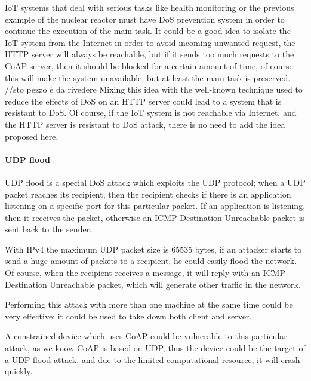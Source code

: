 	IoT systems that deal with serious tasks like health monitoring or the previous example of the nuclear reactor must have DoS prevention system in order to continue the execution of the main task.\newline
	It could be a good idea to isolate the IoT system from the Internet in order to avoid incoming unwanted request, the HTTP server will always be reachable, but if it sends too much requests to the CoAP server, then it should be blocked for a certain amount of time, of course this will make the system unavailable, but at least the main task is preserved.\newline
	//sto pezzo è da rivedere
	Mixing this idea with the well-known technique used to reduce the effects of DoS on an HTTP server could lead to a system that is resistant to DoS.\newline
	Of course, if the IoT system is not reachable via Internet, and the HTTP server is resistant to DoS attack, there is no need to add the idea proposed here.\newline
	
	\paragraph{UDP flood}
	UDP flood is a special DoS attack which exploits the UDP protocol; when a UDP packet reaches its recipient, then the recipient checks if there is an application listening on a specific port for this particular packet.\newline
	If an application is listening, then it receives the packet, otherwise an ICMP Destination Unreachable packet is sent back to the sender.\newline
	
	With IPv4 the maximum UDP packet size is 65535 bytes, if an attacker starts to send a huge amount of packets to a recipient, he could easily flood the network.\newline
	Of course, when the recipient receives a message, it will reply with an ICMP Destination Unreachable packet, which will generate other traffic in the network.\newline
	
	Performing this attack with more than one machine at the same time could be very effective; it could be used to take down both client and server.\newline
	
	A constrained device which uses CoAP could be vulnerable to this particular attack, as we know CoAP is based on UDP, thus the device could be the target of a UDP flood attack, and due to the limited computational resource, it will crash quickly.\newline
	
